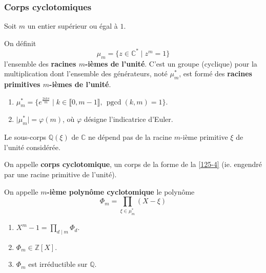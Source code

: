   \subsubsection{Corps cyclotomiques}

  Soit $m$ un entier supérieur ou égal à $1$.


  \begin{definition}
    On définit
    \[ \mu_m = \{ z \in \mathbb{C}^* \mid z^m = 1 \} \]
    l'ensemble des \textbf{racines $m$-ièmes de l'unité}. C'est un groupe (cyclique) pour la multiplication dont l'ensemble des générateurs, noté $\mu_m^*$, est formé des \textbf{racines primitives $m$-ièmes de l'unité}.
  \end{definition}

  \begin{proposition}
    \begin{enumerate}[label=(\roman*)]
      \item $\mu_m^* = \{ e^{\frac{2ik\pi}{m}} \mid k \in \llbracket 0, m-1 \rrbracket, \, \operatorname{pgcd}(k, m) = 1 \}$.
      \item $\vert \mu_m^* \vert = \varphi(m)$, où $\varphi$ désigne l'indicatrice d'Euler.
    \end{enumerate}
  \end{proposition}

  \begin{proposition}
    \label{125-4}
    Le sous-corps $\mathbb{Q}(\xi)$ de $\mathbb{C}$ ne dépend pas de la racine $m$-ième primitive $\xi$ de l'unité considérée.
  \end{proposition}

  \begin{definition}
    On appelle \textbf{corps cyclotomique}, un corps de la forme de la \cref{125-4} (ie. engendré par une racine primitive de l'unité).
  \end{definition}

  \begin{definition}
    On appelle \textbf{$m$-ième polynôme cyclotomique} le polynôme
    \[ \Phi_m = \prod_{\xi \in \mu_m^*} (X - \xi) \]
  \end{definition}

  \begin{theorem}
    \begin{enumerate}[label=(\roman*)]
      \item $X^m - 1 = \prod_{d \mid m} \Phi_d$.
      \item $\Phi_m \in \mathbb{Z}[X]$.
      \item $\Phi_m$ est irréductible sur $\mathbb{Q}$.
    \end{enumerate}
  \end{theorem}

